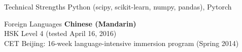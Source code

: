 \documentclass{resume} %
\begin{document}
\begin{rSection}{Technical Strengths}
Python (scipy, scikit-learn, numpy, pandas), Pytorch 



\end{rSection}


\begin{rSection}{Foreign Languages}
\textbf{Chinese (Mandarin)} \\
HSK Level 4 (tested April 16, 2016) \\
CET Beijing: 16-week language-intensive immersion program (Spring 2014)
\end{rSection}

\end{document}

